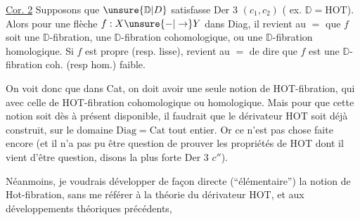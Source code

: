 \uline{Cor. 2} Supposons que $\unsure{\mathbb D|D}$ satisfasse Der 3 $(c_1,c_2)$ ( ex. $\mathbb D=\mathrm{HOT}$). Alors  pour une flèche $f:X\unsure{\mathord{-}|\to}Y$ dans Diag, il revient au $=$ que $f$ soit une  $\mathbb D$-fibration, une $\mathbb D$-fibration cohomologique, ou une $\mathbb D$-fibration homologique. Si $f$ est propre (resp. lisse),  revient au $=$ de dire que $f$ est une $\mathbb D$-fibration coh. (resp hom.) faible.



On voit donc que dans Cat, on doit avoir une seule notion  de HOT-fibration, qui  avec celle de HOT-fibration cohomologique ou homologique. Mais pour que cette notion soit dès à présent disponible, il faudrait que le dérivateur HOT soit déjà construit, sur le domaine $\mathrm{Diag}=\mathrm{Cat}$ tout entier. Or ce n'est pas chose faite encore (et il n'a  pas pu être question de prouver les propriétés de HOT dont il vient d'être question, disons la plus forte Der 3 $c''$).

Néanmoins, je voudrais développer de façon directe (``élémentaire'') la notion de Hot-fibration, sans me référer à la théorie du dérivateur HOT, et aux développements théoriques précédents,
